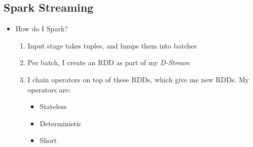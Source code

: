 \documentclass[10pt]{article}
\begin{document}
\subsection{Spark Streaming}

\begin{itemize}
\item How do I Spark?
\begin{enumerate}
\item Input stage takes tuples, and lumps them into batches
\item Per batch, I create an RDD as part of my \emph{D-Stream}
\item I chain operators on top of these RDDs, which give me new RDDs. My operators are:
\begin{itemize}
\item Stateless
\item Deterministic
\item Short
\end{itemize}
\end{enumerate}
\end{itemize}
\end{document}
